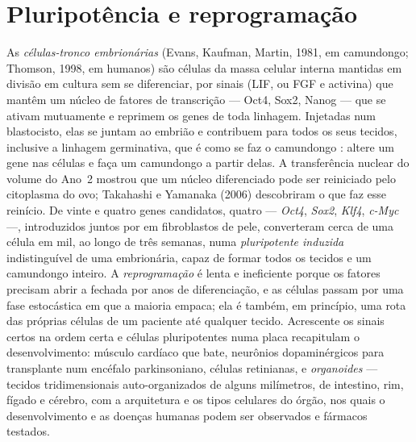 \section{Pluripotência e reprogramação}

\begin{definition}\label{def:b3:stem-cells:pluripotency}
As \emph{células-tronco embrionárias} (Evans, Kaufman, Martin, 1981, em
camundongo; Thomson, 1998, em humanos) são células da massa celular
interna mantidas em divisão em cultura sem se diferenciar, por sinais
(LIF, ou FGF e activina) que mantêm um núcleo de fatores de transcrição
--- Oct4, Sox2, Nanog --- que se ativam mutuamente e reprimem os genes de
toda linhagem. Injetadas num blastocisto, elas se juntam ao embrião e
contribuem para todos os seus tecidos, inclusive a linhagem germinativa,
que é como se faz o camundongo : altere um gene nas células e faça
um camundongo a partir delas. A transferência nuclear do volume do Ano~2
mostrou que um núcleo diferenciado pode ser reiniciado pelo citoplasma do
ovo; Takahashi e Yamanaka (2006) descobriram o que faz esse reinício. De
vinte e quatro genes candidatos, quatro --- \emph{Oct4}, \emph{Sox2},
\emph{Klf4}, \emph{c-Myc} ---, introduzidos juntos por  em
fibroblastos de pele, converteram cerca de uma célula em mil, ao longo de
três semanas, numa \emph{ pluripotente induzida}
indistinguível de uma embrionária, capaz de formar todos os tecidos e um
camundongo inteiro. A \emph{reprogramação} é lenta e ineficiente porque
os fatores precisam abrir a  fechada por anos de diferenciação,
e as células passam por uma fase estocástica em que a maioria empaca; ela
é também, em princípio, uma rota das próprias células de um paciente até
qualquer tecido. Acrescente os sinais certos na ordem certa e células
pluripotentes numa placa recapitulam o desenvolvimento: músculo cardíaco
que bate, neurônios dopaminérgicos para transplante num encéfalo
parkinsoniano, células retinianas, e \emph{organoides} --- tecidos
tridimensionais auto-organizados de alguns milímetros, de intestino, rim,
fígado e cérebro, com a arquitetura e os tipos celulares do órgão, nos
quais o desenvolvimento e as doenças humanas podem ser observados e
fármacos testados.
\end{definition}

